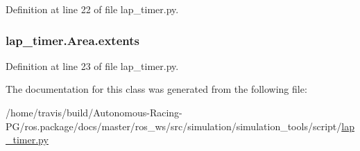 Definition at line 22 of file lap\+\_\+timer.\+py.

\subsubsection[{\texorpdfstring{extents}{extents}}]{\setlength{\rightskip}{0pt plus 5cm}lap\+\_\+timer.\+Area.\+extents}\hypertarget{classlap__timer_1_1_area_a9c808f67a0835a36528d4b7abd4f2950}{}\label{classlap__timer_1_1_area_a9c808f67a0835a36528d4b7abd4f2950}


Definition at line 23 of file lap\+\_\+timer.\+py.



The documentation for this class was generated from the following file\+:\begin{DoxyCompactItemize}
\item 
/home/travis/build/\+Autonomous-\/\+Racing-\/\+P\+G/ros.\+package/docs/master/ros\+\_\+ws/src/simulation/simulation\+\_\+tools/script/\hyperlink{lap__timer_8py}{lap\+\_\+timer.\+py}\end{DoxyCompactItemize}

